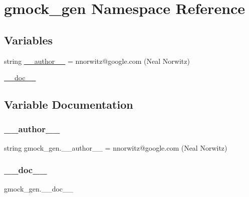 \hypertarget{namespacegmock__gen}{}\section{gmock\+\_\+gen Namespace Reference}
\label{namespacegmock__gen}
\subsection*{Variables}
\begin{DoxyCompactItemize}
\item 
string \mbox{\hyperlink{namespacegmock__gen_adab615bb903ccd6be037728cbd62057b}{\+\_\+\+\_\+author\+\_\+\+\_\+}} = \textquotesingle{}nnorwitz@google.\+com (Neal Norwitz)\textquotesingle{}
\item 
\mbox{\hyperlink{namespacegmock__gen_af72474983cae3039ab18452d6ff6a4ed}{\+\_\+\+\_\+doc\+\_\+\+\_\+}}
\end{DoxyCompactItemize}


\subsection{Variable Documentation}
\mbox{\label{namespacegmock__gen_adab615bb903ccd6be037728cbd62057b}} 
\subsubsection{\texorpdfstring{\_\_author\_\_}{\_\_author\_\_}}
{\footnotesize\ttfamily string gmock\+\_\+gen.\+\_\+\+\_\+author\+\_\+\+\_\+ = \textquotesingle{}nnorwitz@google.\+com (Neal Norwitz)\textquotesingle{}\hspace{0.3cm}{\ttfamily [private]}}

\mbox{\label{namespacegmock__gen_af72474983cae3039ab18452d6ff6a4ed}} 
\subsubsection{\texorpdfstring{\_\_doc\_\_}{\_\_doc\_\_}}
{\footnotesize\ttfamily gmock\+\_\+gen.\+\_\+\+\_\+doc\+\_\+\+\_\+\hspace{0.3cm}{\ttfamily [private]}}

